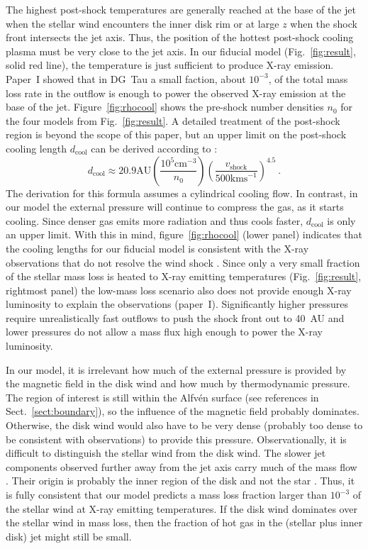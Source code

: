 \documentclass[manuscript]{aastex}
\begin{document}
The highest post-shock temperatures are generally reached at the base of the jet when the stellar wind encounters the inner disk rim or at large $z$ when the shock front intersects the jet axis. Thus, the position of the hottest post-shock cooling plasma must be very close to the jet axis. In our fiducial model (Fig.~\ref{fig:result}, solid red line), the temperature is just sufficient to produce X-ray emission. Paper~I showed that in DG~Tau a small faction, about $10^{-3}$, of the total mass loss rate in the outflow is enough to power the observed X-ray emission at the base of the jet. Figure~\ref{fig:rhocool} shows the pre-shock number densities $n_0$ for the four models from Fig.~\ref{fig:result}. A detailed treatment of the post-shock region is beyond the scope of this paper, but an upper limit on the post-shock cooling length $d_{\mathrm{cool}}$ can be derived according to \citet{2002ApJ...576L.149R}:
\begin{equation}
d_{\mathrm{cool}} \approx 20.9 \mathrm{ AU}
    \left(\frac{10^5\mathrm{ cm}^{-3}}{n_0}\right)
    \left(\frac{v_{\mathrm{shock}}}{500\mathrm{ km s}^{-1}}\right)^{4.5}\ .
\end{equation}
The derivation for this formula assumes a cylindrical cooling flow. In contrast, in our model the external pressure will continue to compress the gas, as it starts cooling. Since denser gas emits more radiation and thus cools faster, $d_{\mathrm{cool}}$ is only an upper limit. With this in mind, figure~\ref{fig:rhocool} (lower panel) indicates that the cooling lengths for our fiducial model is consistent with the X-ray observations that do not resolve the wind shock \citep{2008A&A...488L..13S}. Since only a very small fraction of the stellar mass loss is heated to X-ray emitting temperatures (Fig.~\ref{fig:result}, rightmost panel) the low-mass loss scenario also does not provide enough X-ray luminosity to explain the observations (paper~I).
Significantly higher pressures require unrealistically fast outflows to push the shock front out to 40~AU and lower pressures do not allow a mass flux high enough to power the X-ray luminosity.

In our model, it is irrelevant how much of the external pressure is provided by the magnetic field in the disk wind and how much by thermodynamic pressure. The region of interest is still within the Alfv\'en surface (see references in Sect.~\ref{sect:boundary}), so the influence of the magnetic field probably dominates. Otherwise, the disk wind would also have to be very dense (probably too dense to be consistent with observations) to provide this pressure. Observationally, it is difficult to distinguish the stellar wind from the disk wind. The slower jet components observed further away from the jet axis carry much of the mass flow \citep{2000ApJ...537L..49B}. Their origin is probably the inner region of the disk and not the star \citep{2003ApJ...590L.107A}. Thus, it is fully consistent that our model predicts a mass loss fraction larger than  $10^{-3}$ of the stellar wind at X-ray emitting temperatures. If the disk wind dominates over the stellar wind in mass loss, then the fraction of hot gas in the (stellar plus inner disk) jet might still be small.
\end{document}
